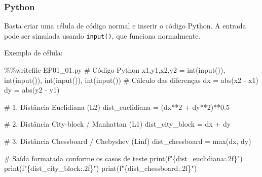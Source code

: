 \documentclass[
  portuguese,
  letterpaper,
  openany,
  oneside,
  12pt,
  a4paper]{book}
\newenvironment{Shaded}{\begin{snugshade}}{\end{snugshade}}
\newcommand{\BuiltInTok}[1]{\textcolor[rgb]{0.00,0.23,0.31}{#1}}
\newcommand{\CommentTok}[1]{\textcolor[rgb]{0.37,0.37,0.37}{#1}}
\newcommand{\DecValTok}[1]{\textcolor[rgb]{0.68,0.00,0.00}{#1}}
\newcommand{\FloatTok}[1]{\textcolor[rgb]{0.68,0.00,0.00}{#1}}
\newcommand{\NormalTok}[1]{\textcolor[rgb]{0.00,0.23,0.31}{#1}}
\newcommand{\OperatorTok}[1]{\textcolor[rgb]{0.37,0.37,0.37}{#1}}
\newcommand{\SpecialCharTok}[1]{\textcolor[rgb]{0.37,0.37,0.37}{#1}}
\newcommand{\SpecialStringTok}[1]{\textcolor[rgb]{0.13,0.47,0.30}{#1}}
\begin{document}
\subsubsection{\texorpdfstring{
Python}{ Python}}\label{python}

Basta criar uma célula de código normal e inserir o código Python. A
entrada pode ser simulada usando \texttt{input()}, que funciona
normalmente.

Exemplo de célula:

\begin{Shaded}
\begin{Highlighting}[]
\OperatorTok{\%\%}\NormalTok{writefile EP01\_01.py}
\CommentTok{\# Código Python}
\NormalTok{x1,y1,x2,y2 }\OperatorTok{=} \BuiltInTok{int}\NormalTok{(}\BuiltInTok{input}\NormalTok{()), }\BuiltInTok{int}\NormalTok{(}\BuiltInTok{input}\NormalTok{()), }\BuiltInTok{int}\NormalTok{(}\BuiltInTok{input}\NormalTok{()), }\BuiltInTok{int}\NormalTok{(}\BuiltInTok{input}\NormalTok{())}
\CommentTok{\# Cálculo das diferenças}
\NormalTok{dx }\OperatorTok{=} \BuiltInTok{abs}\NormalTok{(x2 }\OperatorTok{{-}}\NormalTok{ x1)}
\NormalTok{dy }\OperatorTok{=} \BuiltInTok{abs}\NormalTok{(y2 }\OperatorTok{{-}}\NormalTok{ y1)}

\CommentTok{\# 1. Distância Euclidiana (L2)}
\NormalTok{dist\_euclidiana }\OperatorTok{=}\NormalTok{ (dx}\OperatorTok{**}\DecValTok{2} \OperatorTok{+}\NormalTok{ dy}\OperatorTok{**}\DecValTok{2}\NormalTok{)}\OperatorTok{**}\FloatTok{0.5}

\CommentTok{\# 2. Distância City{-}block / Manhattan (L1)}
\NormalTok{dist\_city\_block }\OperatorTok{=}\NormalTok{ dx }\OperatorTok{+}\NormalTok{ dy}

\CommentTok{\# 3. Distância Chessboard / Chebyshev (Linf)}
\NormalTok{dist\_chessboard }\OperatorTok{=} \BuiltInTok{max}\NormalTok{(dx, dy)}

\CommentTok{\# Saída formatada conforme os casos de teste}
\BuiltInTok{print}\NormalTok{(}\SpecialStringTok{f"}\SpecialCharTok{\{}\NormalTok{dist\_euclidiana}\SpecialCharTok{:.2f\}}\SpecialStringTok{"}\NormalTok{)}
\BuiltInTok{print}\NormalTok{(}\SpecialStringTok{f"}\SpecialCharTok{\{}\NormalTok{dist\_city\_block}\SpecialCharTok{:.2f\}}\SpecialStringTok{"}\NormalTok{)}
\BuiltInTok{print}\NormalTok{(}\SpecialStringTok{f"}\SpecialCharTok{\{}\NormalTok{dist\_chessboard}\SpecialCharTok{:.2f\}}\SpecialStringTok{"}\NormalTok{)}
\end{Highlighting}
\end{Shaded}
\end{document}
